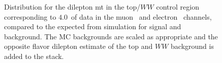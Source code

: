 \begin{figure}[!hbtp]
\begin{center}
\caption{Distribution for the dilepton mt in the top/$WW$ control region corresponding 
to $4.0$~\ifb of data in the muon~ and electron~ channels, 
compared to the expected from simulation for signal and background. The MC backgrounds are scaled as 
appropriate and the opposite flavor dilepton estimate of the top and $WW$ background is added to the stack.}
\label{fig:topww_mt}
\end{center}
\end{figure}

